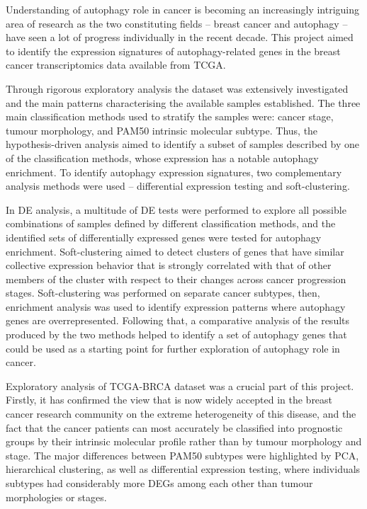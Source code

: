 Understanding of autophagy role in cancer is becoming an increasingly intriguing area of research as the two constituting fields -- breast cancer and autophagy -- have seen a lot of progress individually in the recent decade. This project aimed to identify the expression signatures of autophagy-related genes in the breast cancer transcriptomics data available from TCGA. 

Through rigorous exploratory analysis the dataset was extensively investigated and the main patterns characterising the available samples established. The three main classification methods  used to stratify the samples were: cancer stage, tumour morphology, and PAM50 intrinsic molecular subtype. Thus, the hypothesis-driven analysis aimed to identify a subset of samples described by one of the classification methods, whose expression has a notable autophagy enrichment. To identify autophagy expression signatures, two complementary analysis methods were used -- differential expression testing and soft-clustering. 

In DE analysis, a multitude of DE tests were performed to explore all possible combinations of samples defined by different classification methods, and the identified sets of differentially expressed genes were tested for autophagy enrichment. Soft-clustering aimed to detect clusters of genes that have similar collective expression behavior that is strongly correlated with that of other members of the cluster with respect to their changes across cancer progression stages. Soft-clustering was performed on separate cancer subtypes, then, enrichment analysis was used to identify expression patterns where autophagy genes are overrepresented. Following that, a comparative analysis of the results produced by the two methods helped to identify a set of autophagy genes that could be used as a starting point for further exploration of autophagy role in cancer.

Exploratory analysis of TCGA-BRCA dataset was a crucial part of this project. Firstly, it has confirmed the view that is now widely accepted in the breast cancer research community on the extreme heterogeneity of this disease, and the fact that the cancer patients can most accurately be classified into prognostic groups by their intrinsic molecular profile rather than by tumour morphology and stage. The major differences between PAM50 subtypes were highlighted by PCA, hierarchical clustering, as well as differential expression testing, where individuals subtypes had considerably more DEGs among each other than tumour morphologies or stages. 


